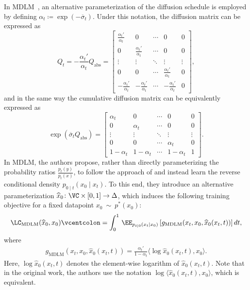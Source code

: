         In MDLM~\citep[Appendix C]{sahoo2024simple}, an alternative parameterization of the diffusion schedule is employed by defining $\alpha_t \coloneqq \exp(-\overline{\sigma}_t)$. Under this notation, the diffusion matrix can be expressed as
        \begin{equation}
            Q_t = -\frac{\alpha_t'}{\alpha_t} Q_{\text{abs}} =
            \begin{bmatrix}
                \frac{\alpha_t'}{\alpha_t} & 0 & \cdots & 0 & 0 \\
                0 & \frac{\alpha_t'}{\alpha_t} & \cdots & 0 & 0 \\
                \vdots & \vdots & \ddots & \vdots & \vdots \\
                0 & 0 & \cdots & \frac{\alpha_t'}{\alpha_t} & 0 \\
                -\frac{\alpha_t'}{\alpha_t} & -\frac{\alpha_t'}{\alpha_t} & \cdots & -\frac{\alpha_t'}{\alpha_t} & 0
            \end{bmatrix},
        \end{equation}
        and in the same way the cumulative diffusion matrix can be equivalently expressed as
        \begin{equation}
            \exp(\overline{\sigma}_t Q_{\text{abs}}) =
            \begin{bmatrix}
                \alpha_t & 0 & \cdots & 0 & 0 \\
                0 & \alpha_t & \cdots & 0 & 0 \\
                \vdots & \vdots & \ddots & \vdots & \vdots \\
                0 & 0 & \cdots & \alpha_t & 0 \\
                1 - \alpha_t & 1 - \alpha_t & \cdots & 1 - \alpha_t & 1 
            \end{bmatrix}.
        \end{equation}
        In MDLM, the authors propose, rather than directly parameterizing the probability ratios $\frac{p_t(y)}{p_t(x)}$, to follow the approach of \citet{ho2020denoising, austin2021structured, campbell2022continuous} and instead learn the reverse conditional density $p_{0\mid t}(x_0 \mid x_t)$. To this end, they introduce an alternative parameterization $\widehat{x}_0\colon \VC \times [0, 1] \to \Delta$, which induces the following training objective for a fixed datapoint $x_0~\sim~p^*(x_0)$:
        \begin{gather}
          \LC_{\text{MDLM}}(\widehat{x}_0, x_0) \vcentcolon= \int_0^1 \, \EE_{p_{t|0}(x_t \mid x_0)} \left[ g_{\text{MDLM}}(x_t, x_0, \widehat{x}_0(x_t, t))\right]dt, \nonumber
        \end{gather}
        where 
        \begin{gather}
        \label{eq:g mdlm}
            g_{\text{MDLM}}(x_t, x_0, \widehat{x}_0(x_t, t)) = \frac{\alpha_t'}{1-\alpha_t} \langle \log\widehat{x}_0(x_t, t), x_0 \rangle.
        \end{gather}
        Here, $\log \widehat{x}_0(x_t, t)$ denotes the element-wise logarithm of $\widehat{x}_0(x_t, t)$. Note that in the original work, the authors use the notation $\log \langle \widehat{x}_0(x_t, t), x_0 \rangle$, which is equivalent.
